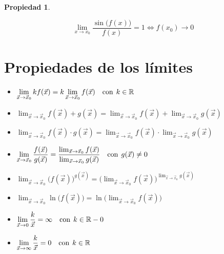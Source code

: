 \documentclass[a5paper,12pt,twoside]{book}
\newtheorem{prop}{{Propiedad}}[chapter]
\begin{document}

\begin{mdframed}[style=MyFrame1]
    \begin{prop}
    \end{prop}
    \begin{equation*}
        \lim_{x \to x_0} \dfrac{\sin{\Big( f(x) \Big)}}{f(x)} = 1 \iff f(x_0) \rightarrow 0
    \end{equation*}
\end{mdframed}


\section{Propiedades de los límites}

\begin{itemize}
\item $\displaystyle\lim_{\Vec{x} \to \Vec{x}_0} k f(\Vec{x}) = k \displaystyle\lim_{\Vec{x} \to \Vec{x}_0} f(\Vec{x}) \quad \textrm{con} \hspace{1ex} k \in \mathbb{R}$

\item $\displaystyle\lim_{\Vec{x} \to \Vec{x}_0} f(\Vec{x})+g(\Vec{x})=\displaystyle\lim_{\Vec{x} \to \Vec{x}_0} f(\Vec{x}) + \displaystyle\lim_{\Vec{x} \to \Vec{x}_0} g(\Vec{x})$

\item $\displaystyle\lim_{\Vec{x} \to \Vec{x}_0} f(\Vec{x}) \cdot g(\Vec{x})=\displaystyle\lim_{\Vec{x} \to \Vec{x}_0} f(\Vec{x}) \cdot \displaystyle\lim_{\Vec{x} \to \Vec{x}_0} g(\Vec{x})$

\item $\displaystyle\lim_{\Vec{x} \to \Vec{x}_0} \dfrac{f(\Vec{x})}{g(\Vec{x})} = \dfrac{\lim_{\Vec{x} \to \Vec{x}_0} f(\Vec{x})}{\lim_{\Vec{x} \to \Vec{x}_0} g(\Vec{x})} \quad \textrm{con} \hspace{1ex} g(\Vec{x}) \neq 0$

\item $\displaystyle\lim_{\Vec{x} \to \Vec{x}_0} \Big( f(\Vec{x}) \Big)^{g(\Vec{x})}= \Big( \displaystyle\lim_{\Vec{x} \to \Vec{x}_0} f(\Vec{x}) \Big)^{\lim_{\Vec{x} \to \Vec{x}_0} g(\Vec{x})}$

\item $\displaystyle\lim_{\Vec{x} \to \Vec{x}_0} \ln{\Big( f(\Vec{x}) \Big)} = \ln{\Big( \displaystyle\lim_{\Vec{x} \to \Vec{x}_0} f(\Vec{x}) \Big)}$

\item $\displaystyle\lim_{\Vec{x} \to 0} \dfrac{k}{\Vec{x}} = \infty \quad \textrm{con} \hspace{1ex} k \in \mathbb{R}-0$

\item $\displaystyle\lim_{\Vec{x} \to \infty} \dfrac{k}{\Vec{x}} = 0 \quad \textrm{con} \hspace{1ex} k \in \mathbb{R}$

\end{itemize}
\end{document}
